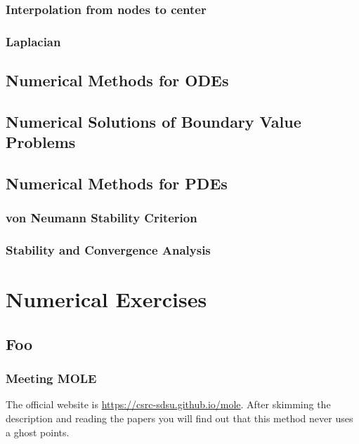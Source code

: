 \documentclass[a4paper,abstract=true]{scrreprt}
\begin{document}
\section{Interpolation from nodes to center}

\section{Laplacian}

\chapter{Numerical Methods for ODEs}


\chapter{Numerical Solutions of Boundary Value Problems}

\chapter{Numerical Methods for PDEs}

\section{von Neumann Stability Criterion}

\section{Stability and Convergence Analysis}

\part{Numerical Exercises}

\chapter{Foo}

\section{Meeting MOLE}

The official website is \url{https://csrc-sdsu.github.io/mole}.
After skimming the description and reading the papers you will find out that this method never uses a ghost points.
\end{document}
